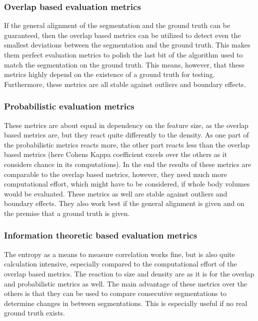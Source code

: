 \documentclass[journal]{IEEEtran}
\begin{document}
{\parindent0pt   %

\subsubsection{Overlap based evaluation metrics}
If the general alignment of the segmentation and the ground truth can be guaranteed, then the overlap based metrics can be utilized to detect even the smallest deviations between the segmentation and the ground truth. This makes them perfect evaluation metrics to polish the last bit of the algorithm used to match the segmentation on the ground truth. This means, however, that these metrics highly depend on the existence of a ground truth for testing. Furthermore, these metrics are all stable against outliers and boundary effects.

\subsubsection{Probabilistic evaluation metrics}
These metrics are about equal in dependency on the feature size, as the overlap based metrics are, but they react quite differently to the density. As one part of the probabilistic metrics reacts more, the other part reacts less than the overlap based metrics (here Cohens Kappa coefficient excels over the others as it considers chance in its computations). In the end the results of these metrics are comparable to the overlap based metrics, however, they need much more computational effort, which might have to be considered, if whole body volumes would be evaluated. These metrics as well are stable against outliers and boundary effects. They also work best if the general alignment is given and on the premise that a ground truth is given.

\subsubsection{Information theoretic based evaluation metrics}
The entropy as a means to measure correlation works fine, but is also quite calculation intensive, especially compared to the computational effort of the overlap based metrics. The reaction to size and density are as it is for the overlap and probabilistic metrics as well. The main advantage of these metrics over the others is that they can be used to compare consecutive segmentations to determine changes in between segmentations. This is especially useful if no real ground truth exists.

}
\end{document}
